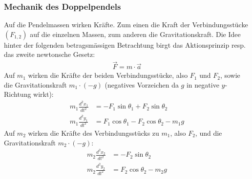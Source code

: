 \documentclass[titlepage, 11pt, a4paper, ngerman]{article}
\begin{document}
\subsubsection{Mechanik des Doppelpendels}
Auf die Pendelmassen wirken Kräfte. Zum einen die Kraft der Verbindungsstücke $(F_{1, 2})$ auf die einzelnen Massen, zum anderen die Gravitationskraft. Die Idee hinter der folgenden betragsmässigen Betrachtung birgt das Aktionsprinzip resp. das zweite newtonsche Gesetz: 
\begin{align*}
    \vec{F} = m \cdot \vec{a}
\end{align*}
\bigbreak
Auf $m_{1}$ wirken die Kräfte der beiden Verbindungsstücke, also $F_{1}$ und $F_{2}$, sowie die Gravitationskraft $m_{1} \cdot (-g)$ (negatives Vorzeichen da $g$ in negative $y$-Richtung wirkt):
\begin{align}
    m_{1} \frac{d^{2}x_{1}}{dt^{2}} &= -F_{1} \sin{\theta_{1}} + F_{2} \sin{\theta_{2}} \\
    m_{1} \frac{d^{2}y_{1}}{dt^{2}} &= F_{1} \cos{\theta_{1}} - F_{2} \cos{\theta_{2}} - m_{1}g
\end{align}
\bigbreak
Auf $m_{2}$ wirken die Kräfte des Verbindungsstücks zu $m_{1}$, also $F_{2}$, und die Gravitationskraft $m_{2} \cdot (-g)$:
\begin{align}
    m_{2} \frac{d^{2}x_{2}}{dt^{2}} &= -F_{2} \sin{\theta_{2}} \\
    m_{2} \frac{d^{2}y_{2}}{dt^{2}} &= F_{2} \cos{\theta_{2}} -m_{2}g
\end{align}
\end{document}
